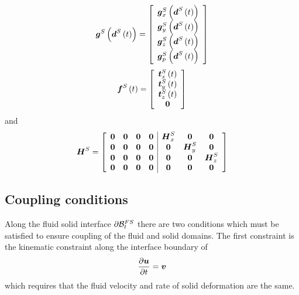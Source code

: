 \begin{equation}
   \boldsymbol{g}^{S}\left(  \boldsymbol{d}^{S}\left( t \right)  \right) =\left[\begin{array}{c}
   \boldsymbol{g}^{S}_{x}\left(  \boldsymbol{d}^{S}\left( t \right)  \right)  \\
   \boldsymbol{g}^{S}_{y}\left(  \boldsymbol{d}^{S}\left( t \right)  \right)  \\
   \boldsymbol{g}^{S}_{z}\left(  \boldsymbol{d}^{S}\left( t \right)  \right)  \\
   \boldsymbol{g}^{S}_{p}\left(  \boldsymbol{d}^{S}\left( t \right)  \right) 
  \end{array}\right]
\end{equation}
\begin{equation}
   \boldsymbol{f}^{S}\left( t \right) =\left[\begin{array}{c}
   \boldsymbol{t}^{S}_{x}\left( t \right)  \\
   \boldsymbol{t}^{S}_{y}\left( t \right)  \\
   \boldsymbol{t}^{S}_{z}\left( t \right)  \\
  \boldsymbol{0}
  \end{array}\right]
\end{equation}
and
\begin{equation}
  \matr{H}^{S}=\left[\begin{array}{cccc|ccc}
    \matr{0} & \matr{0} & \matr{0} & \matr{0} & \matr{H}^{S}_{x} & \matr{0} & \matr{0} \\
    \matr{0} & \matr{0} & \matr{0} & \matr{0} & \matr{0} & \matr{H}^{S}_{y} & \matr{0} \\
    \matr{0} & \matr{0} & \matr{0} & \matr{0} & \matr{0} & \matr{0} & \matr{H}^{S}_{z} \\
    \matr{0} & \matr{0} & \matr{0} & \matr{0} & \matr{0} & \matr{0} & \matr{0}
  \end{array}\right]
\end{equation}

\subsection{Coupling conditions}

Along the fluid solid interface $ \partial{\ensuremath{ \mathcal{B} }} _{t}^{FS}$ there
are two conditions which must be satisfied to ensure coupling of the fluid and
solid domains. The first constraint is the kinematic constraint along the
interface boundary of
\begin{equation}
  \delby{\vectr{u}}{t}=\vectr{v} \label{eqn:FSIKinematicConstraint}
\end{equation}
which requires that the fluid velocity and rate of solid deformation are the
same.

